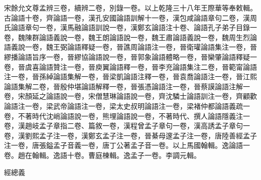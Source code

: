 \begin{pinyinscope}
宋餘允文尊孟辨三卷，續辨二卷，別錄一卷。以上乾隆三十八年王際華等奉敕輯。古論語十卷，齊論語一卷，漢孔安國論語訓解十一卷，漢包咸論語章句二卷，漢周氏論語章句一卷，漢馬融論語訓說一卷，漢鄭玄論語注十卷、論語孔子弟子目錄一卷，魏陳群論語義說一卷，魏王朗論語說一卷，魏王肅論語義說一卷，魏周生烈論語義說一卷，魏王弼論語釋疑一卷，晉譙周論語注一卷，晉衛瓘論語集注一卷，晉繆播論語旨序一卷，晉繆協論語說一卷，晉郭象論語體略一卷，晉欒肇論語釋疑一卷，晉虞喜論語贊注一卷，晉庾翼論語釋一卷，晉李充論語集注二卷，晉範甯論語注一卷，晉孫綽論語集解一卷，晉梁凱論語注釋一卷，晉袁喬論語注一卷，晉江熙論語集解二卷，晉殷仲堪論語解釋一卷，晉張憑論語注一卷，晉蔡謨論語注解一卷，宋顏延之論語說一卷，宋僧慧琳論語說一卷，齊沈驎士論語訓注一卷，齊顧歡論語注一卷，梁武帝論語注一卷，梁太史叔明論語注一卷，梁褚仲都論語義疏一卷，不著時代沈峭論語說一卷，熊埋論語說一卷，不著時代、撰人論語隱義注一卷，漢趙岐孟子章指二卷、篇敘一卷，漢程曾孟子章句一卷，漢高誘孟子章句一卷，漢劉熙孟子注一卷，漢鄭玄孟子注一卷，晉綦母邃孟子注一卷，唐陸善經孟子注一卷，唐張鎰孟子音義一卷，唐丁公著孟子音一卷。以上馬國翰輯。逸論語一卷。趙在翰輯。逸語十卷。曹庭棟輯。逸孟子一卷。李調元輯。

經總義


\end{pinyinscope}
